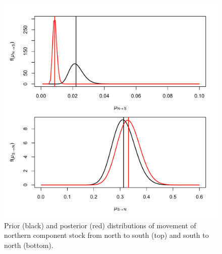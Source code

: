 \documentclass[
]{article}
\begin{document}
\begin{figure}

{\centering \includegraphics[width=1\linewidth]{move_prior_post} 

}

\caption{Prior (black) and posterior (red) distributions of movement of northern component stock from north to south (top) and south to north (bottom).}\label{fig:move-prior-posterior}
\end{figure}
\pagebreak
\end{document}
